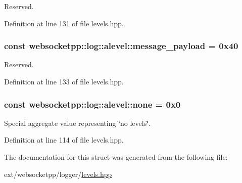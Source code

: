 Reserved. 



Definition at line 131 of file levels.\+hpp.

\hypertarget{structwebsocketpp_1_1log_1_1alevel_ace7d9b9c9ed82029ec93c4f45081b7ac}{}
\subsubsection[{message\+\_\+payload}]{ const websocketpp\+::log\+::alevel\+::message\+\_\+payload = 0x40\hspace{0.3cm}{\ttfamily [static]}}\label{structwebsocketpp_1_1log_1_1alevel_ace7d9b9c9ed82029ec93c4f45081b7ac}


Reserved. 



Definition at line 133 of file levels.\+hpp.

\hypertarget{structwebsocketpp_1_1log_1_1alevel_a4cf0520816094999975fe73081cf30f2}{}
\subsubsection[{none}]{ const websocketpp\+::log\+::alevel\+::none = 0x0\hspace{0.3cm}{\ttfamily [static]}}\label{structwebsocketpp_1_1log_1_1alevel_a4cf0520816094999975fe73081cf30f2}


Special aggregate value representing \char`\"{}no levels\char`\"{}. 



Definition at line 114 of file levels.\+hpp.



The documentation for this struct was generated from the following file\+:\begin{DoxyCompactItemize}
\item 
ext/websocketpp/logger/\hyperlink{levels_8hpp}{levels.\+hpp}\end{DoxyCompactItemize}
